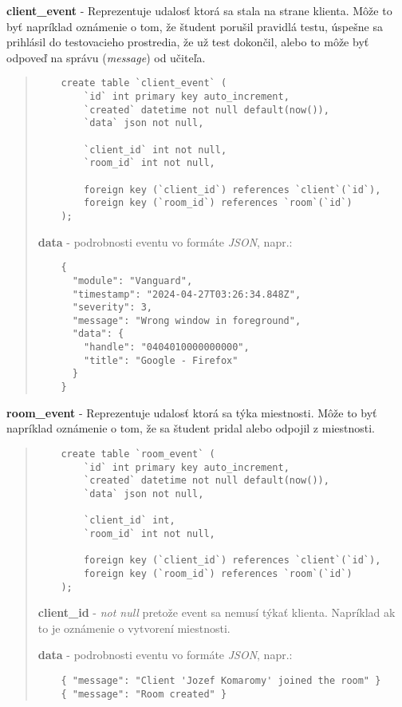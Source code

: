 \documentclass{article}
\newcommand{\filedesc}[1]{\vspace{0.3cm} \noindent \textbf{#1}}
\begin{document}
\filedesc{client{\_}event} - Reprezentuje udalosť ktorá sa stala na strane klienta. Môže to byť napríklad oznámenie o tom, že študent porušil pravidlá testu, úspešne sa prihlásil do testovacieho prostredia, že už test dokončil, alebo to môže byť odpoveď na správu (\emph{message}) od učiteľa.

\begin{quote}

  \begin{verbatim}
    create table `client_event` (
        `id` int primary key auto_increment,
        `created` datetime not null default(now()),
        `data` json not null,
        
        `client_id` int not null,
        `room_id` int not null,

        foreign key (`client_id`) references `client`(`id`),
        foreign key (`room_id`) references `room`(`id`)
    );
  \end{verbatim}

  \filedesc{data} - podrobnosti eventu vo formáte \emph{JSON}, napr.:

  \begin{verbatim}
    {
      "module": "Vanguard",
      "timestamp": "2024-04-27T03:26:34.848Z",
      "severity": 3,
      "message": "Wrong window in foreground",
      "data": {
        "handle": "0404010000000000",
        "title": "Google - Firefox"
      }
    }
  \end{verbatim}

\end{quote}

\filedesc{room{\_}event} - Reprezentuje udalosť ktorá sa týka miestnosti. Môže to byť napríklad oznámenie o tom, že sa študent pridal alebo odpojil z miestnosti.

\begin{quote}

  \begin{verbatim}
    create table `room_event` (
        `id` int primary key auto_increment,
        `created` datetime not null default(now()),
        `data` json not null,

        `client_id` int,
        `room_id` int not null,

        foreign key (`client_id`) references `client`(`id`),
        foreign key (`room_id`) references `room`(`id`)
    );
  \end{verbatim}

  \filedesc{client{\_}id} - \emph{not null} pretože event sa nemusí týkať klienta. Napríklad ak to je oznámenie o vytvorení miestnosti.

  \filedesc{data} - podrobnosti eventu vo formáte \emph{JSON}, napr.:

  \begin{verbatim}
    { "message": "Client 'Jozef Komaromy' joined the room" }
    { "message": "Room created" }
  \end{verbatim}

\end{quote}
\end{document}
